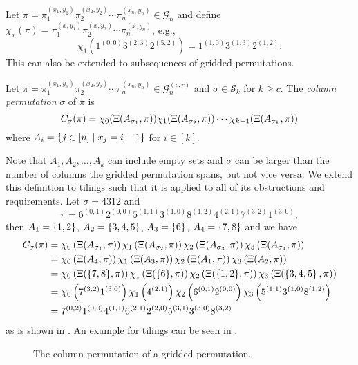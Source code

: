 Let $\pi=\pi_1^{(x_1,y_1)}\pi_2^{(x_2,y_2)}\dotsm\pi_n^{(x_n,y_n)} \in \mathcal{G}_n$ and define $\chi_x(\pi) = \pi_1^{(x,y_1)}\pi_2^{(x,y_2)}\dotsm\pi_n^{(x,y_n)}$, e.g.,
\[
\chi_{1}\left(1^{(0,0)}3^{(2,3)}2^{(5,2)}\right) = 1^{(1,0)}3^{(1,3)}2^{(1,2)}.
\]
This can also be extended to subsequences of gridded permutations.

\begin{definition}
Let $\pi = \pi_1^{(x_1,y_1)}\pi_2^{(x_2,y_2)}\dotsm\pi_n^{(x_n,y_n)} \in \mathcal{G}_n^{(c,r)}$ and $\sigma \in \mathcal{S}_k$ for $k \geq c$. The \emph{column permutation} $\sigma$ of $\pi$ is 
\[
    C_\sigma(\pi) = \chi_0(\Xi(A_{\sigma_1},\pi))\chi_1(\Xi(A_{\sigma_2},\pi)) \dotsm \chi_{k-1}(\Xi(A_{\sigma_k},\pi))
\]
where $A_i = \left\{j \in [n] \mid x_j = i - 1\right\}$ for $i \in [k]$.
\end{definition}

Note that $A_1,A_2,\dotsc,A_k$ can include empty sets and $\sigma$ can be larger than the number of columns the gridded permutation spans, but not vice versa. We extend this definition to tilings such that it is applied to all of its obstructions and requirements. Let $\sigma = 4312$ and
\[
\pi = 6^{(0,1)}2^{(0,0)}5^{(1,1)}3^{(1,0)}8^{(1,2)}4^{(2,1)}7^{(3,2)}1^{(3,0)},
\]
then $A_1=\left\{1,2\right\}$, $A_2=\left\{3,4,5\right\}$, $A_3=\left\{6\right\}$, $A_4=\left\{7,8\right\}$ and we have
\begin{align*}
    C_\sigma(\pi) &= \chi_0\left(\Xi(A_{\sigma_1},\pi)\right)\chi_1\left(\Xi(A_{\sigma_2},\pi)\right)\chi_2\left(\Xi(A_{\sigma_3},\pi)\right) \chi_3\left(\Xi(A_{\sigma_{4}},\pi)\right) \\
    &= \chi_0\left(\Xi(A_{4},\pi)\right)\chi_1\left(\Xi(A_{3},\pi)\right)\chi_2\left(\Xi(A_{1},\pi)\right)\chi_3\left(\Xi(A_{2},\pi)\right) \\
    &= \chi_0\left(\Xi({\left\{7,8\right\}},\pi)\right) \chi_1\left(\Xi({\left\{6\right\}},\pi)\right)\chi_2\left(\Xi({\left\{1,2\right\}},\pi)\right)\chi_3\left(\Xi(\left\{3,4,5\right\},\pi)\right) \\
    &= \chi_0\left(7^{(3,2)}1^{(3,0)}\right)\chi_1\left(4^{(2,1)}\right)\chi_2\left(6^{(0,1)}2^{(0,0)}\right)\chi_3\left(5^{(1,1)}3^{(1,0)}8^{(1,2)}\right) \\
    &= 7^{(0,2)}1^{(0,0)}4^{(1,1)}6^{(2,1)}2^{(2,0)}5^{(3,1)}3^{(3,0)}8^{(3,2)}
\end{align*}
as is shown in . An example for tilings can be seen in .

\begin{figure}[ht!]
    \centering
    
    \caption{The column permutation of a gridded permutation.}
    \label{fig:gp_col_perm}
\end{figure}

